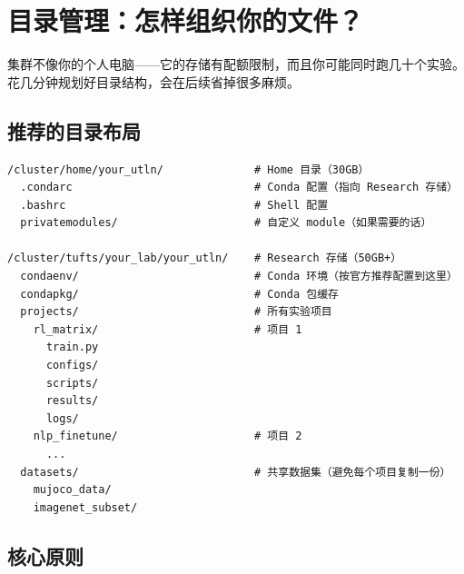 \section{目录管理：怎样组织你的文件？}

集群不像你的个人电脑——它的存储有配额限制，而且你可能同时跑几十个实验。花几分钟规划好目录结构，会在后续省掉很多麻烦。

\subsection{推荐的目录布局}

\begin{lstlisting}
/cluster/home/your_utln/              # Home 目录（30GB）
  .condarc                            # Conda 配置（指向 Research 存储）
  .bashrc                             # Shell 配置
  privatemodules/                     # 自定义 module（如果需要的话）

/cluster/tufts/your_lab/your_utln/    # Research 存储（50GB+）
  condaenv/                           # Conda 环境（按官方推荐配置到这里）
  condapkg/                           # Conda 包缓存
  projects/                           # 所有实验项目
    rl_matrix/                        # 项目 1
      train.py
      configs/
      scripts/
      results/
      logs/
    nlp_finetune/                     # 项目 2
      ...
  datasets/                           # 共享数据集（避免每个项目复制一份）
    mujoco_data/
    imagenet_subset/
\end{lstlisting}

\subsection{核心原则}


